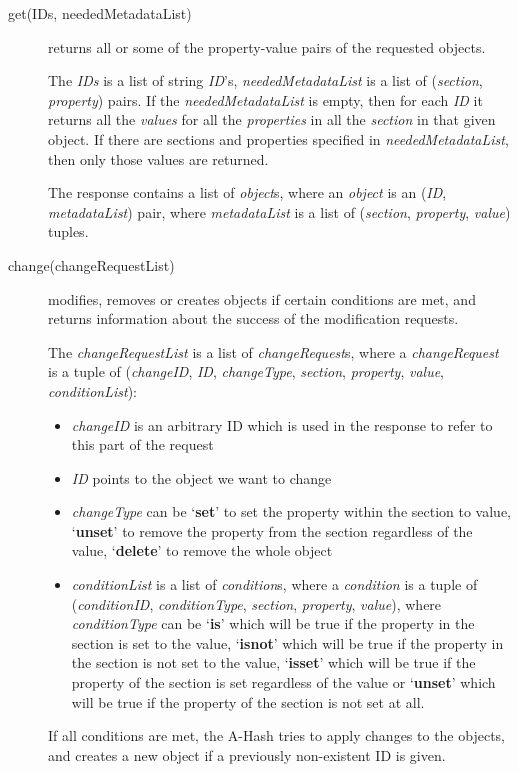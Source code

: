 \documentclass{book}
\begin{document}
\begin{description}
    \item [get(IDs, neededMetadataList)] returns all or some of the property-value pairs of the requested objects.
    
    The \emph{IDs} is a list of string \emph{ID}'s, \emph{neededMetadataList} is a list of (\emph{section}, \emph{property}) pairs. If the \emph{neededMetadataList} is empty, then for each \emph{ID} it returns all the \emph{values} for all the \emph{properties} in all the \emph{section} in that given object. If there are sections and properties specified in \emph{neededMetadataList}, then only those values are returned.

    The response contains a list of \emph{object}s, where an \emph{object} is an (\emph{ID}, \emph{metadataList}) pair, where \emph{metadataList} is a list of (\emph{section}, \emph{property}, \emph{value}) tuples.

    \item [change(changeRequestList)] modifies, removes or creates objects if certain conditions are met, and returns information about the success of the modification requests.
    
    The \emph{changeRequestList} is a list of \emph{changeRequest}s, where a \emph{changeRequest} is a tuple of (\emph{changeID}, \emph{ID}, \emph{changeType}, \emph{section}, \emph{property}, \emph{value}, \emph{conditionList}):
\begin{itemize}
\item \emph{changeID} is an arbitrary ID which is used in the response to refer to this part of the request
\item \emph{ID} points to the object we want to change
\item \emph{changeType} can be `\textbf{set}' to set the property within the section to value, `\textbf{unset}' to remove the property from the section regardless of the value, `\textbf{delete}' to remove the whole object
\item \emph{conditionList} is a list of \emph{condition}s, where a \emph{condition} is a tuple of (\emph{conditionID}, \emph{conditionType}, \emph{section}, \emph{property}, \emph{value}), where \emph{conditionType} can be `\textbf{is}' which will be true if the property in the section is set to the value, `\textbf{isnot}' which will be true if the property in the section is not set to the value, `\textbf{isset}' which will be true if the property of the section is set regardless of the value or `\textbf{unset}' which will be true if the property of the section is not set at all.
\end{itemize}
    If all conditions are met, the A-Hash tries to apply changes to the objects, and creates a new object if a previously non-existent ID is given.
    

\end{description}
\end{document}
